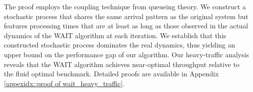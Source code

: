 
The proof employs the coupling technique from queueing theory. We construct a stochastic process that shares the same arrival pattern as the original system but features processing times that are at least as long as those observed in the actual dynamics of the WAIT algorithm at each iteration. We establish that this constructed stochastic process dominates the real dynamics, thus yielding an upper bound on the performance gap of our algorithm. Our heavy-traffic analysis reveals that the WAIT algorithm achieves near-optimal throughput relative to the fluid optimal benchmark. Detailed proofs are available in Appendix \ref{appexidx::proof of wait_heavy_traffic}.

